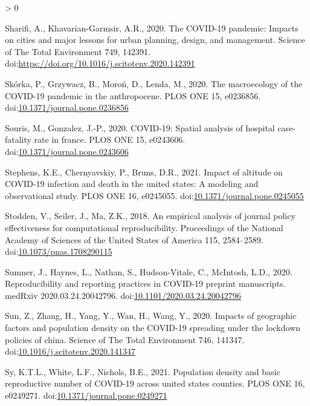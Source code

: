 \documentclass[]{elsarticle} %
\newlength{\cslhangindent}
\newenvironment{CSLReferences}[2] %
 {%
  \setlength{\parindent}{0pt}
  \ifodd #1 \everypar{\setlength{\hangindent}{\cslhangindent}}\ignorespaces\fi
  \ifnum #2 > 0
  \setlength{\parskip}{#2\baselineskip}
  \fi
 }%
 {}
\begin{document}
\begin{CSLReferences}{1}{0}
\leavevmode\hypertarget{ref-Sharifi2020covid}{}%
Sharifi, A., Khavarian-Garmsir, A.R., 2020. The COVID-19 pandemic:
Impacts on cities and major lessons for urban planning, design, and
management. Science of The Total Environment 749, 142391.
doi:\url{https://doi.org/10.1016/j.scitotenv.2020.142391}

\leavevmode\hypertarget{ref-Skorka2020macroecology}{}%
Skórka, P., Grzywacz, B., Moroń, D., Lenda, M., 2020. The macroecology
of the COVID-19 pandemic in the anthropocene. PLOS ONE 15, e0236856.
doi:\href{https://doi.org/10.1371/journal.pone.0236856}{10.1371/journal.pone.0236856}

\leavevmode\hypertarget{ref-Souris2020covid}{}%
Souris, M., Gonzalez, J.-P., 2020. COVID-19: Spatial analysis of
hospital case-fatality rate in france. PLOS ONE 15, e0243606.
doi:\href{https://doi.org/10.1371/journal.pone.0243606}{10.1371/journal.pone.0243606}

\leavevmode\hypertarget{ref-Stephens2021impact}{}%
Stephens, K.E., Chernyavskiy, P., Bruns, D.R., 2021. Impact of altitude
on COVID-19 infection and death in the united states: A modeling and
observational study. PLOS ONE 16, e0245055.
doi:\href{https://doi.org/10.1371/journal.pone.0245055}{10.1371/journal.pone.0245055}

\leavevmode\hypertarget{ref-Stodden2018empirical}{}%
Stodden, V., Seiler, J., Ma, Z.K., 2018. An empirical analysis of
journal policy effectiveness for computational reproducibility.
Proceedings of the National Academy of Sciences of the United States of
America 115, 2584--2589.
doi:\href{https://doi.org/10.1073/pnas.1708290115}{10.1073/pnas.1708290115}

\leavevmode\hypertarget{ref-Sumner2020reproducibility}{}%
Sumner, J., Haynes, L., Nathan, S., Hudson-Vitale, C., McIntosh, L.D.,
2020. Reproducibility and reporting practices in COVID-19 preprint
manuscripts. medRxiv 2020.03.24.20042796.
doi:\href{https://doi.org/10.1101/2020.03.24.20042796}{10.1101/2020.03.24.20042796}

\leavevmode\hypertarget{ref-Sun2020impacts}{}%
Sun, Z., Zhang, H., Yang, Y., Wan, H., Wang, Y., 2020. Impacts of
geographic factors and population density on the COVID-19 spreading
under the lockdown policies of china. Science of The Total Environment
746, 141347.
doi:\href{https://doi.org/10.1016/j.scitotenv.2020.141347}{10.1016/j.scitotenv.2020.141347}

\leavevmode\hypertarget{ref-Sy2021population}{}%
Sy, K.T.L., White, L.F., Nichols, B.E., 2021. Population density and
basic reproductive number of COVID-19 across united states counties.
PLOS ONE 16, e0249271.
doi:\href{https://doi.org/10.1371/journal.pone.0249271}{10.1371/journal.pone.0249271}


\end{CSLReferences}
\end{document}
